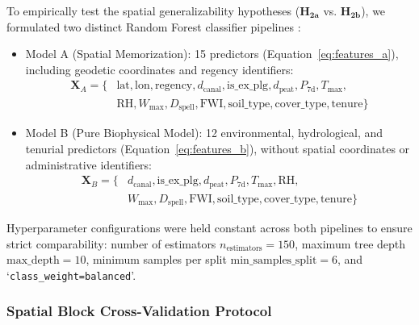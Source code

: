 To empirically test the spatial generalizability hypotheses ($\mathbf{H_{2a}}$ vs. $\mathbf{H_{2b}}$), we formulated two distinct Random Forest classifier pipelines \citep{Breiman2001ML}:
\begin{itemize}
    \item Model A (Spatial Memorization): 15 predictors (Equation~\eqref{eq:features_a}), including geodetic coordinates and regency identifiers:
    \begin{equation}
    \begin{aligned}
    \mathbf{X}_A = \{ & \text{lat}, \text{lon}, \text{regency}, d_{\text{canal}}, \text{is\_ex\_plg}, d_{\text{peat}}, P_{\text{7d}}, T_{\text{max}}, \\
    & \text{RH}, W_{\text{max}}, D_{\text{spell}}, \text{FWI}, \text{soil\_type}, \text{cover\_type}, \text{tenure} \}
    \end{aligned}
    \label{eq:features_a}
    \end{equation}
    \item Model B (Pure Biophysical Model): 12 environmental, hydrological, and tenurial predictors (Equation~\eqref{eq:features_b}), without spatial coordinates or administrative identifiers:
    \begin{equation}
    \begin{aligned}
    \mathbf{X}_B = \{ & d_{\text{canal}}, \text{is\_ex\_plg}, d_{\text{peat}}, P_{\text{7d}}, T_{\text{max}}, \text{RH}, \\
    & W_{\text{max}}, D_{\text{spell}}, \text{FWI}, \text{soil\_type}, \text{cover\_type}, \text{tenure} \}
    \end{aligned}
    \label{eq:features_b}
    \end{equation}
\end{itemize}

Hyperparameter configurations were held constant across both pipelines to ensure strict comparability: number of estimators $n_{\text{estimators}} = 150$, maximum tree depth $\text{max\_depth} = 10$, minimum samples per split $\text{min\_samples\_split} = 6$, and `\texttt{class\_weight=balanced}'.

\subsubsection{Spatial Block Cross-Validation Protocol}
\label{subsubsec:spatial_cv_protocol}

